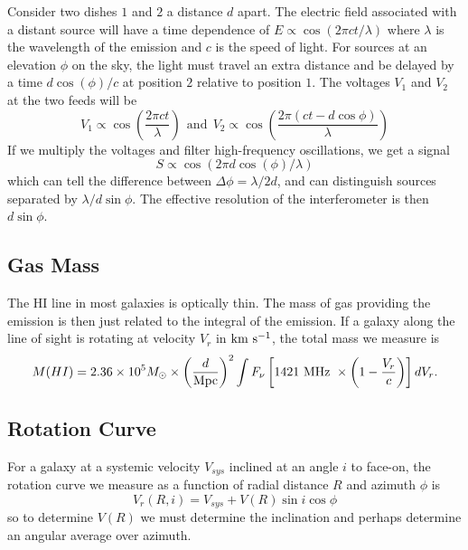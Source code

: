 \documentclass[]{article}
\begin{document}
Consider two dishes $1$ and $2$ a distance $d$ apart.
The electric field associated with a distant source will
have a time dependence of $E\propto\cos(2\pi ct/\lambda)$ where
$\lambda$ is the wavelength of the emission and $c$ is the speed
of light. For sources at an elevation $\phi$ on the sky, the
light must travel an extra distance and be delayed by a time
$d\cos(\phi)/c$ at position $2$ relative to position $1$.
The voltages $V_1$ and $V_2$ at the two feeds will be
\begin{equation}
V_1 \propto \cos\left(\frac{2\pi ct}{\lambda}\right)~~\mathrm{and}~~V_2\propto\cos\left(\frac{2\pi(ct-d\cos\phi)}{\lambda}\right)
\end{equation}
\noindent
If we multiply the voltages and filter high-frequency oscillations, we get a signal
\begin{equation}
S\propto \cos(2\pi d \cos(\phi)/\lambda)
\end{equation}
\noindent
which can tell the difference between $\Delta\phi = \lambda/2d$, and can
distinguish sources separated by $\lambda/d\sin\phi$. The effective resolution
of the interferometer is then $d\sin\phi$.


\subsection{Gas Mass}

The HI line in most galaxies is optically thin.  The mass of gas providing the
emission is then just related to the integral of the emission.  If a galaxy 
along the line of sight is rotating at velocity $V_r$ in $\mathrm{km}~\mathrm{s}^{-1}$, 
the total mass we measure
is
\begin{equation}
M(HI) = 2.36\times10^5 M_{\odot} \times \left(\frac{d}{\mathrm{Mpc}}\right)^2 \int F_{\nu}\left[1421~\mathrm{MHz}~\times\left(1-\frac{V_r}{c}\right)\right] dV_r.
\end{equation}

\subsection{Rotation Curve}

For a galaxy at a systemic velocity $V_{sys}$ inclined at an angle $i$ to face-on, the rotation curve we measure as a function of radial distance $R$ and azimuth $\phi$ is
\begin{equation}
V_r(R,i) = V_{sys} + V(R)\sin i \cos \phi
\end{equation}
\noindent
so to determine $V(R)$ we must determine the inclination and perhaps determine an angular average over azimuth.
\end{document}
